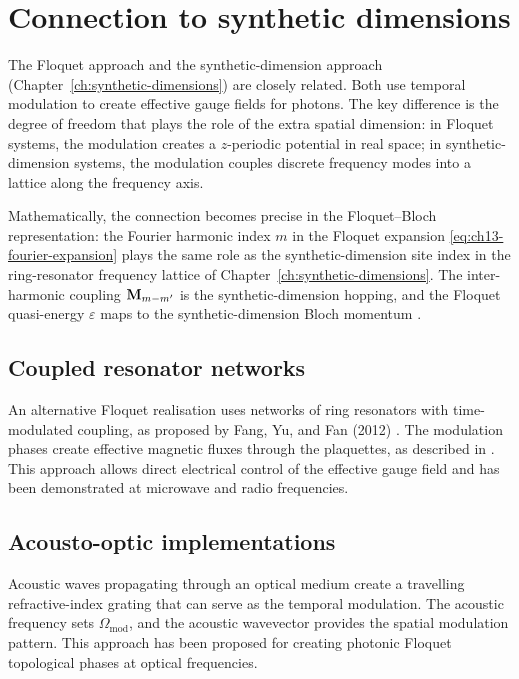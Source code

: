 \section{Connection to synthetic dimensions}
\label{sec:ch13-synthetic-connection}

The Floquet approach and the synthetic-dimension approach
(Chapter~\ref{ch:synthetic-dimensions}) are closely related.  Both use
temporal modulation to create effective gauge fields for photons.  The
key difference is the degree of freedom that plays the role of the
extra spatial dimension: in Floquet systems, the modulation creates a
$z$-periodic potential in real space; in synthetic-dimension systems,
the modulation couples discrete frequency modes into a lattice along
the frequency axis.

Mathematically, the connection becomes precise in the Floquet--Bloch
representation: the Fourier harmonic index $m$ in the Floquet expansion
\eqref{eq:ch13-fourier-expansion} plays the same role as the
synthetic-dimension site index in the ring-resonator frequency lattice
of Chapter~\ref{ch:synthetic-dimensions}.  The inter-harmonic coupling
$\mathbf{M}_{m-m'}$ is the synthetic-dimension hopping, and the Floquet
quasi-energy $\varepsilon$ maps to the synthetic-dimension Bloch
momentum \cite{ozawa2018topological,price2022roadmap}.

\subsection{Coupled resonator networks}
\label{sec:ch13-resonators}

An alternative Floquet realisation uses networks of ring resonators with
time-modulated coupling, as proposed by Fang, Yu, and Fan (2012)
\cite{ozawa2018topological}.  The
modulation phases create effective magnetic fluxes through the
plaquettes, as described in .  This
approach allows direct electrical control of the effective gauge field
and has been demonstrated at microwave and radio frequencies.

\subsection{Acousto-optic implementations}
\label{sec:ch13-acousto-optic}

Acoustic waves propagating through an optical medium create a
travelling refractive-index grating that can serve as the temporal
modulation.  The acoustic frequency sets $\Omega_{\mathrm{mod}}$, and
the acoustic wavevector provides the spatial modulation pattern.  This
approach has been proposed for creating photonic Floquet topological
phases at optical frequencies.


